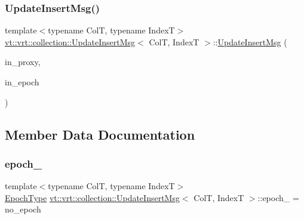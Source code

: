 \subsubsection{\texorpdfstring{Update\+Insert\+Msg()}{UpdateInsertMsg()}\hspace{0.1cm}{\footnotesize\ttfamily [2/2]}}
{\footnotesize\ttfamily template$<$typename ColT, typename IndexT$>$ \\
\hyperlink{structvt_1_1vrt_1_1collection_1_1_update_insert_msg}{vt\+::vrt\+::collection\+::\+Update\+Insert\+Msg}$<$ ColT, IndexT $>$\+::\hyperlink{structvt_1_1vrt_1_1collection_1_1_update_insert_msg}{Update\+Insert\+Msg} (\begin{DoxyParamCaption}\item[{\hyperlink{structvt_1_1vrt_1_1collection_1_1_collection_proxy}{Collection\+Proxy}$<$ ColT, IndexT $>$}]{in\+\_\+proxy,  }\item[{\hyperlink{namespacevt_a985a5adf291c34a3ca263b3378388236}{Epoch\+Type} const \&}]{in\+\_\+epoch }\end{DoxyParamCaption})\hspace{0.3cm}{\ttfamily [inline]}}



\subsection{Member Data Documentation}
\mbox{\label{structvt_1_1vrt_1_1collection_1_1_update_insert_msg_a6639021b34fd80c4c17a65b7fe9034f6}} 
\subsubsection{\texorpdfstring{epoch\+\_\+}{epoch\_}}
{\footnotesize\ttfamily template$<$typename ColT, typename IndexT$>$ \\
\hyperlink{namespacevt_a985a5adf291c34a3ca263b3378388236}{Epoch\+Type} \hyperlink{structvt_1_1vrt_1_1collection_1_1_update_insert_msg}{vt\+::vrt\+::collection\+::\+Update\+Insert\+Msg}$<$ ColT, IndexT $>$\+::epoch\+\_\+ = no\+\_\+epoch}

\mbox{\label{structvt_1_1vrt_1_1collection_1_1_update_insert_msg_ae24b0b8a8147f78cb6275b97ddb3d6a0}} 
